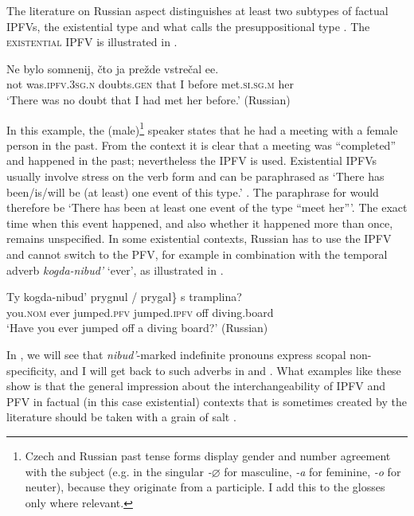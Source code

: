 \documentclass[output=paper,colorlinks,citecolor=brown]{langscibook}
\begin{document}
The literature on Russian aspect distinguishes at least two subtypes of factual IPFVs, the existential type \citep[][]{paduceva96, gronndiss} and what \citeauthor{gronndiss} calls the presuppositional type \citep[the ``actional'' type in][]{paduceva96}. The \textsc{existential IPFV} is illustrated in  \citep[corpus example from][180; my glosses]{gronndiss}.

\ea\label{ex:existential} 
\gll Ne bylo somnenij, čto ja prežde vstrečal ee.\\
not was.\textsc{ipfv.3sg.n} doubts.\textsc{gen} that I before met.\textsc{si.sg.m} her\\
\glt `There was no doubt that I had met her before.' \hfill (Russian)
\z

\noindent In this example, the (male)\footnote{Czech and Russian past tense forms display gender and number agreement with the subject (e.g. in the singular \textit{-$\varnothing$} for masculine, \textit{-a} for feminine, \textit{-o} for neuter), because they originate from a participle. I add this to the glosses only where relevant.} speaker states that he had a meeting with a female person in the past. From the context it is clear that a meeting was ``completed'' and happened in the past; nevertheless the IPFV is used. Existential IPFVs usually involve stress on the verb form and can be paraphrased as `There has been/is/will be (at least) one event of this type.' \citep[following the idea that existential IPFVs involve event types or kinds; see][]{mehlig01, mehlig13, %
gehrkemueller}. The paraphrase for  would therefore be `There has been at least one event of the type ``meet her'''. The exact time when this event happened, and also whether it happened more than once, remains unspecified. In some existential contexts, Russian has to use the IPFV and cannot switch to the PFV, for example in combination with the temporal adverb \textit{kogda-nibud'} `ever', as illustrated in  \citep[adapted from][104]{Dickey2000}.

\ea\label{ex:kogda-nibud'}
\gll Ty kogda-nibud' \minsp{\{*} prygnul / prygal\} s tramplina?\\
    you.\textsc{nom} ever {} jumped.\textsc{pfv} {} jumped.\textsc{ipfv} off diving.board\\
\glt `Have you ever jumped off a diving board?' \hfill (Russian) 
\z 

\noindent In , we will see that \textit{nibud'}-marked indefinite pronouns express scopal non-specificity, and I will get back to such adverbs in  and . What examples like these show is that the general impression about the interchangeability of IPFV and PFV in factual (in this case existential) contexts that is sometimes created by the literature should be taken with a grain of salt \citep[see also][]{duebbersdiss}.
\end{document}
